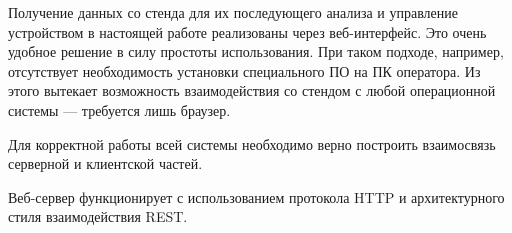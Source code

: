 Получение данных со стенда для их последующего анализа и управление устройством в настоящей работе реализованы через веб-интерфейс. Это очень удобное решение в силу простоты использования. При таком подходе, например, отсутствует необходимость установки специального ПО на ПК оператора. Из этого вытекает возможность взаимодействия со стендом с любой операционной системы --- требуется лишь браузер.\par
Для корректной работы всей системы необходимо верно построить взаимосвязь серверной и клиентской частей.\par
Веб-сервер функционирует с использованием протокола HTTP и архитектурного стиля взаимодействия REST.\par
